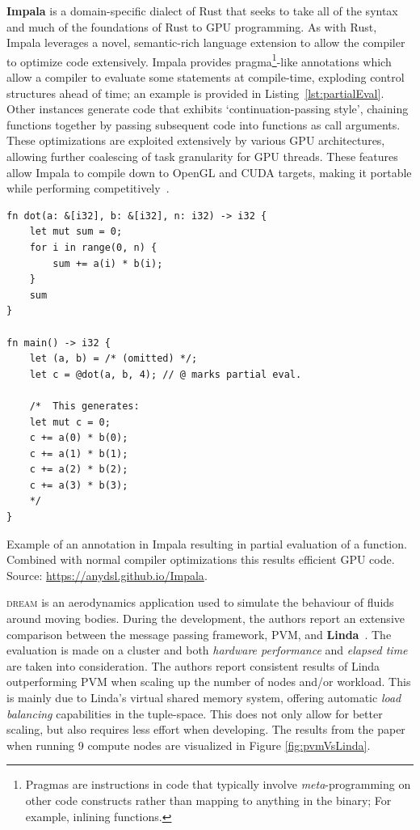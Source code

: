 \textbf{Impala} is a domain-specific dialect of Rust that seeks to take all of the syntax and much of the foundations of Rust to GPU programming. As with Rust, Impala leverages a novel, semantic-rich language extension to allow the compiler to optimize code extensively. Impala provides pragma\footnote{Pragmas are instructions in code that typically involve \textit{meta}-programming on other code constructs rather than mapping to anything in the binary; For example, inlining functions.}-like annotations which allow a compiler to evaluate some statements at compile-time, exploding control structures ahead of time; an example is provided in Listing~\ref{lst:partialEval}. Other instances generate code that exhibits `continuation-passing style', chaining functions together by passing subsequent code into functions as call arguments. These optimizations are exploited extensively by various GPU architectures, allowing further coalescing of task granularity for GPU threads. These features allow Impala to compile down to OpenGL and CUDA targets, making it portable while performing competitively~\cite{impala}.

\begin{listing}[t!]
\footnotesize
\begin{verbatim}
fn dot(a: &[i32], b: &[i32], n: i32) -> i32 {
    let mut sum = 0;
    for i in range(0, n) {
        sum += a(i) * b(i);
    }
    sum
}

fn main() -> i32 {
    let (a, b) = /* (omitted) */;
    let c = @dot(a, b, 4); // @ marks partial eval.
    
    /*  This generates:
    let mut c = 0;
    c += a(0) * b(0);
    c += a(1) * b(1);
    c += a(2) * b(2);
    c += a(3) * b(3);
	*/
}
\end{verbatim}
\caption{Example of an annotation in Impala resulting in partial evaluation of a function. Combined with normal compiler optimizations this results efficient GPU code. Source: \url{https://anydsl.github.io/Impala}.}
\label{lst:partialEval}
\end{listing}

\textsc{dream} is an aerodynamics application used to simulate the behaviour of fluids around moving bodies.
During the development, the authors report an extensive comparison between the message passing framework, PVM, and \textbf{Linda}~\cite{pvm, LindaVSMessage}. The evaluation is made on a cluster and both \textit{hardware performance} and \textit{elapsed time} are taken into consideration. The authors report consistent results of Linda outperforming PVM when scaling up the number of nodes and/or workload. This is mainly due to Linda's virtual shared memory system, offering automatic \textit{load balancing} capabilities in the tuple-space. This does not only allow for better scaling, but also requires less effort when developing. The results from the paper when running 9 compute nodes are visualized in Figure \ref{fig:pvmVsLinda}.

